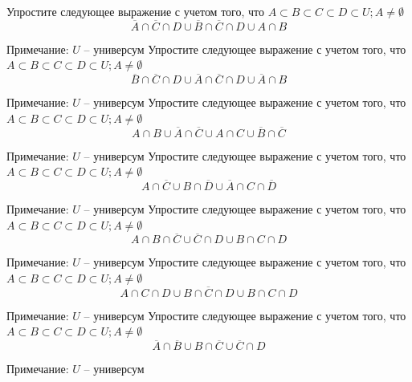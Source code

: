 \documentclass[10pt]{exam}
\begin{document}
\begin{questions}
\question
Упростите следующее выражение с учетом того, что $A\subset B \subset C \subset D \subset U; A \neq \emptyset$
\begin{equation*}
	\overline{A} \cap \overline{C} \cap D \cup \overline{B} \cap \overline{C} \cap D \cup A \cap B
\end{equation*}

Примечание: $U$ -- универсум\question
Упростите следующее выражение с учетом того, что $A\subset B \subset C \subset D \subset U; A \neq \emptyset$
\begin{equation*}
	\overline{B} \cap \overline{C} \cap D \cup \overline{A} \cap \overline{C} \cap D \cup \overline{A} \cap B
\end{equation*}

Примечание: $U$ -- универсум\question
Упростите следующее выражение с учетом того, что $A\subset B \subset C \subset D \subset U; A \neq \emptyset$
\begin{equation*}
	A \cap B \cup \overline{A} \cap \overline{C} \cup A \cap C \cup \overline{B} \cap \overline{C}
\end{equation*}

Примечание: $U$ -- универсум\question
Упростите следующее выражение с учетом того, что $A\subset B \subset C \subset D \subset U; A \neq \emptyset$
\begin{equation*}
	A \cap  \overline{C} \cup B \cap \overline{D} \cup  \overline{A} \cap C \cap  \overline{D}
\end{equation*}

Примечание: $U$ -- универсум\question
Упростите следующее выражение с учетом того, что $A\subset B \subset C \subset D \subset U; A \neq \emptyset$
\begin{equation*}
	A \cap B  \cap \overline{C} \cup \overline{C} \cap D \cup B \cap C \cap D
\end{equation*}

Примечание: $U$ -- универсум\question
Упростите следующее выражение с учетом того, что $A\subset B \subset C \subset D \subset U; A \neq \emptyset$
\begin{equation*}
	A \cap C  \cap D \cup B \cap \overline{C} \cap D \cup B \cap C \cap D
\end{equation*}

Примечание: $U$ -- универсум\question
Упростите следующее выражение с учетом того, что $A\subset B \subset C \subset D \subset U; A \neq \emptyset$
\begin{equation*}
	\overline{A} \cap \overline{B} \cup B \cap \overline{C} \cup \overline{C} \cap D
\end{equation*}

Примечание: $U$ -- универсум

\end{questions}
\end{document}
